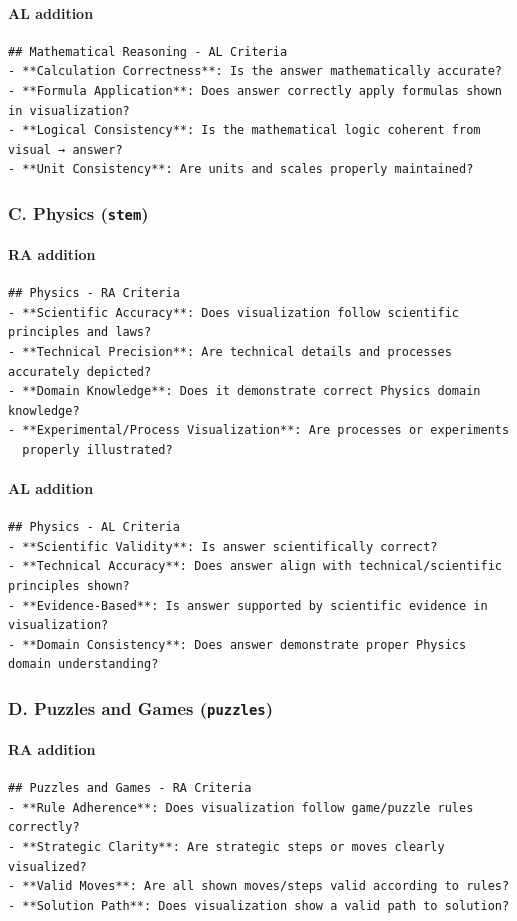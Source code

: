 \documentclass{article}
\theoremstyle{plain}
\theoremstyle{definition}
\theoremstyle{remark}
\begin{document}
\paragraph{AL addition}
\begin{verbatim}
## Mathematical Reasoning - AL Criteria
- **Calculation Correctness**: Is the answer mathematically accurate?
- **Formula Application**: Does answer correctly apply formulas shown in visualization?
- **Logical Consistency**: Is the mathematical logic coherent from visual → answer?
- **Unit Consistency**: Are units and scales properly maintained?
\end{verbatim}

\subsubsection*{C. Physics (\texttt{stem})}
\paragraph{RA addition}
\begin{verbatim}
## Physics - RA Criteria
- **Scientific Accuracy**: Does visualization follow scientific principles and laws?
- **Technical Precision**: Are technical details and processes accurately depicted?
- **Domain Knowledge**: Does it demonstrate correct Physics domain knowledge?
- **Experimental/Process Visualization**: Are processes or experiments
  properly illustrated?
\end{verbatim}
\paragraph{AL addition}
\begin{verbatim}
## Physics - AL Criteria
- **Scientific Validity**: Is answer scientifically correct?
- **Technical Accuracy**: Does answer align with technical/scientific principles shown?
- **Evidence-Based**: Is answer supported by scientific evidence in visualization?
- **Domain Consistency**: Does answer demonstrate proper Physics domain understanding?
\end{verbatim}

\subsubsection*{D. Puzzles and Games (\texttt{puzzles})}
\paragraph{RA addition}
\begin{verbatim}
## Puzzles and Games - RA Criteria
- **Rule Adherence**: Does visualization follow game/puzzle rules correctly?
- **Strategic Clarity**: Are strategic steps or moves clearly visualized?
- **Valid Moves**: Are all shown moves/steps valid according to rules?
- **Solution Path**: Does visualization show a valid path to solution?
\end{verbatim}
\end{document}
